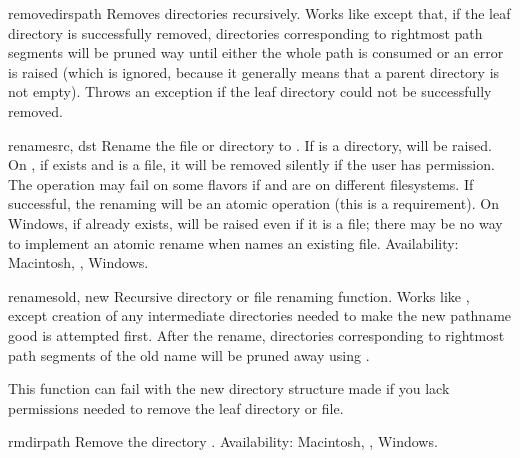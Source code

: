 \begin{funcdesc}{removedirs}{path}
Removes directories recursively.  Works like
 except that, if the leaf directory is
successfully removed, directories corresponding to rightmost path
segments will be pruned way until either the whole path is consumed or
an error is raised (which is ignored, because it generally means that
a parent directory is not empty).  Throws an 
exception if the leaf directory could not be successfully removed.
\end{funcdesc}

\begin{funcdesc}{rename}{src, dst}
Rename the file or directory  to .  If  is
a directory,  will be raised.  On \UNIX, if
 exists and is a file, it will be removed silently if the
user has permission.  The operation may fail on some \UNIX{} flavors
if  and  are on different filesystems.  If
successful, the renaming will be an atomic operation (this is a
\POSIX{} requirement).  On Windows, if  already exists,
 will be raised even if it is a file; there may be
no way to implement an atomic rename when  names an existing
file.
Availability: Macintosh, \UNIX, Windows.
\end{funcdesc}

\begin{funcdesc}{renames}{old, new}
Recursive directory or file renaming function.
Works like , except creation of any intermediate
directories needed to make the new pathname good is attempted first.
After the rename, directories corresponding to rightmost path segments
of the old name will be pruned away using .

\begin{notice}
This function can fail with the new directory structure made if
you lack permissions needed to remove the leaf directory or file.
\end{notice}
\end{funcdesc}

\begin{funcdesc}{rmdir}{path}
Remove the directory .
Availability: Macintosh, \UNIX, Windows.
\end{funcdesc}

